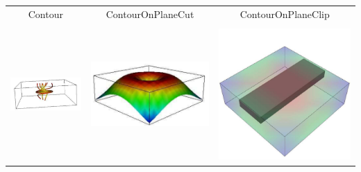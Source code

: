 \begin{table}[t]
\begin{tabular}{c c c}
Contour & ContourOnPlaneCut & ContourOnPlaneClip\\ \\  
\includegraphics[width=\thumbnailwidth]{figures/StreamLine} & 
\includegraphics[width=\thumbnailwidth]{figures/Carpet} & 
\includegraphics[width=\thumbnailwidth]{figures/Rectangle} \\ 

\end{tabular}
\end{table}
